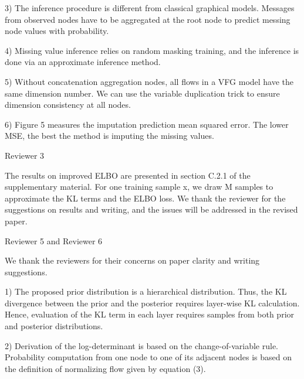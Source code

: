 \documentclass{article} %
\begin{document}
3) The inference procedure is different from classical graphical models. Messages from observed nodes have to be aggregated at the root node to predict messing node values with probability.

4) Missing value inference relies on random masking training, and the inference is done via an approximate inference method.

5) Without concatenation aggregation nodes, all flows in a VFG model have the same dimension number. We can use the variable duplication trick to ensure dimension consistency at all nodes.

6) Figure 5 measures the imputation prediction mean squared error. The lower MSE, the best the method is imputing the missing values.

Reviewer 3

The results on improved ELBO are presented in section C.2.1 of the supplementary material. For one training sample x, we draw M samples to approximate the KL terms and the ELBO loss. We thank the reviewer for the suggestions on results and writing, and the issues will be addressed in the revised paper.

Reviewer 5 and Reviewer 6

We thank the reviewers for their concerns on paper clarity and writing suggestions.

1) The proposed prior distribution is a hierarchical distribution. Thus, the KL divergence between the prior and the posterior requires layer-wise KL calculation. Hence, evaluation of the KL term in each layer requires samples from both prior and posterior distributions.

2) Derivation of the log-determinant is based on the change-of-variable rule. Probability computation from one node to one of its adjacent nodes is based on the definition of normalizing flow given by equation (3).
\end{document}
